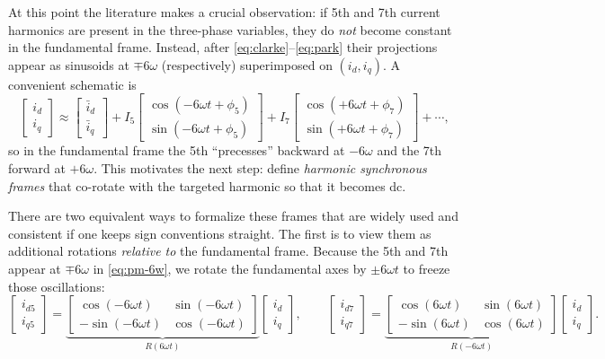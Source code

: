 At this point the literature makes a crucial observation: if 5th and 7th current harmonics are present in the three-phase variables, they do \emph{not} become constant in the fundamental frame. Instead, after \eqref{eq:clarke}–\eqref{eq:park} their projections appear as sinusoids at $\mp 6\omega$ (respectively) superimposed on $(i_d,i_q)$. A convenient schematic is
\begin{equation}
\begin{bmatrix} i_d \\[2pt] i_q \end{bmatrix}
\approx
\begin{bmatrix} \bar i_d \\[2pt] \bar i_q \end{bmatrix}
+
I_5
\begin{bmatrix}
\cos(-6\omega t+\phi_5) \\[2pt]
\sin(-6\omega t+\phi_5)
\end{bmatrix}
+
I_7
\begin{bmatrix}
\cos(+6\omega t+\phi_7) \\[2pt]
\sin(+6\omega t+\phi_7)
\end{bmatrix}
+\cdots,
\label{eq:pm-6w}
\end{equation}
so in the fundamental frame the 5th “precesses” backward at $-6\omega$ and the 7th forward at $+6\omega$. This motivates the next step: define \emph{harmonic synchronous frames} that co-rotate with the targeted harmonic so that it becomes dc.

There are two equivalent ways to formalize these frames that are widely used and consistent if one keeps sign conventions straight. The first is to view them as additional rotations \emph{relative to} the fundamental frame. Because the 5th and 7th appear at $\mp 6\omega$ in \eqref{eq:pm-6w}, we rotate the fundamental axes by $\pm 6\omega t$ to freeze those oscillations:
\begin{equation}
\begin{bmatrix} i_{d5} \\[2pt] i_{q5} \end{bmatrix}
=
\underbrace{\begin{bmatrix}
\cos(-6\omega t) & \sin(-6\omega t)\\
-\sin(-6\omega t) & \cos(-6\omega t)
\end{bmatrix}}_{R(6\omega t)}
\begin{bmatrix} i_d \\[2pt] i_q \end{bmatrix},
\qquad
\begin{bmatrix} i_{d7} \\[2pt] i_{q7} \end{bmatrix}
=
\underbrace{\begin{bmatrix}
\cos(6\omega t) & \sin(6\omega t)\\
-\sin(6\omega t) & \cos(6\omega t)
\end{bmatrix}}_{R(-6\omega t)}
\begin{bmatrix} i_d \\[2pt] i_q \end{bmatrix}.
\label{eq:rel-6w-rotations}
\end{equation}

